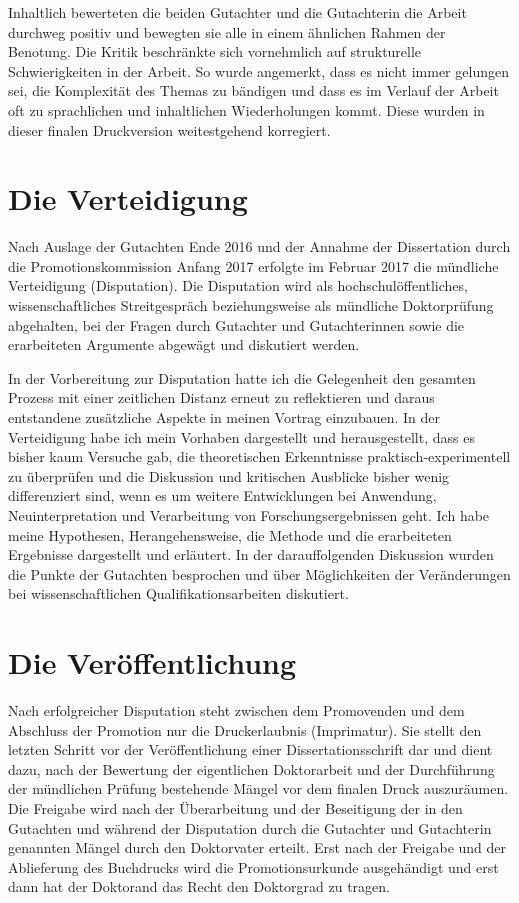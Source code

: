 Inhaltlich bewerteten die beiden Gutachter und die Gutachterin die Arbeit durchweg positiv und bewegten sie alle in einem ähnlichen Rahmen der Benotung. Die Kritik beschränkte sich vornehmlich auf strukturelle Schwierigkeiten in der Arbeit. So wurde angemerkt, dass es nicht immer gelungen sei, die Komplexität des Themas zu bändigen und dass es im Verlauf der Arbeit oft zu sprachlichen und inhaltlichen Wiederholungen kommt. Diese wurden in dieser finalen Druckversion weitestgehend korregiert.

\section{Die Verteidigung}

Nach Auslage der Gutachten Ende 2016 und der Annahme der Dissertation durch die Promotionskommission Anfang 2017 erfolgte im Februar 2017 die mündliche Verteidigung (Disputation). Die Disputation wird als hochschulöffentliches, wissenschaftliches Streitgespräch beziehungsweise als mündliche Doktorprüfung abgehalten, bei der Fragen durch Gutachter und Gutachterinnen sowie die erarbeiteten Argumente abgewägt und diskutiert werden.

In der Vorbereitung zur Disputation hatte ich die Gelegenheit den gesamten Prozess mit einer zeitlichen Distanz erneut zu reflektieren und daraus entstandene zusätzliche Aspekte in meinen Vortrag einzubauen. In der Verteidigung habe ich mein Vorhaben dargestellt und herausgestellt, dass es bisher kaum Versuche gab, die theoretischen Erkenntnisse praktisch-experimentell zu überprüfen und die Diskussion und kritischen Ausblicke bisher wenig differenziert sind, wenn es um weitere Entwicklungen bei Anwendung, Neuinterpretation und Verarbeitung von Forschungsergebnissen geht. Ich habe meine Hypothesen, Herangehensweise, die Methode und die erarbeiteten Ergebnisse dargestellt und erläutert. In der darauffolgenden Diskussion wurden die Punkte der Gutachten besprochen und über Möglichkeiten der Veränderungen bei wissenschaftlichen Qualifikationsarbeiten diskutiert.

\section{Die Veröffentlichung}

Nach erfolgreicher Disputation steht zwischen dem Promovenden und dem Abschluss der Promotion nur die Druckerlaubnis (Imprimatur). Sie stellt den letzten Schritt vor der Veröffentlichung einer Dissertationsschrift dar und dient dazu, nach der Bewertung der eigentlichen Doktorarbeit und der Durchführung der mündlichen Prüfung bestehende Mängel vor dem finalen Druck auszuräumen. Die Freigabe wird nach der Überarbeitung und der Beseitigung der in den Gutachten und während der Disputation durch die Gutachter und Gutachterin genannten Mängel durch den Doktorvater erteilt. Erst nach der Freigabe und der Ablieferung des Buchdrucks wird die Promotionsurkunde ausgehändigt und erst dann hat der Doktorand das Recht den Doktorgrad zu tragen.


